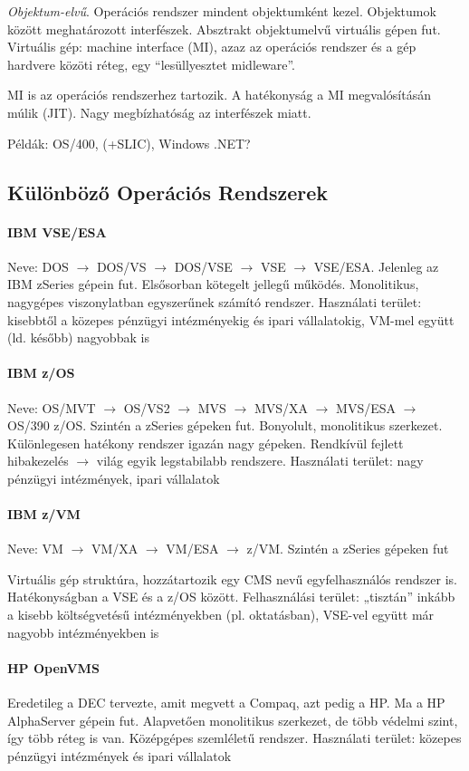 \documentclass[fleqn,10pt,a4paper]{article}
\theoremstyle{magyar}
\begin{document}
  \emph{Objektum-elvű}. Operációs rendszer mindent objektumként kezel. Objektumok között meghatározott
  interfészek. Absztrakt objektumelvű virtuális gépen fut. Virtuális gép: machine interface (MI), azaz az operációs
  rendszer és a gép hardvere közöti réteg, egy ``lesüllyesztet midleware''.
  
  MI is az operációs rendszerhez tartozik. A hatékonyság a MI megvalósításán múlik (JIT). Nagy megbízhatóság az
  interfészek miatt.
  
  Példák: OS/400, (+SLIC), Windows .NET?

  \subsection{Különböző Operációs Rendszerek}

  \paragraph{IBM VSE/ESA} Neve: DOS $\to$ DOS/VS $\to$ DOS/VSE $\to$ VSE $\to$ VSE/ESA. Jelenleg az IBM zSeries gépein fut.
  Elsősorban kötegelt jellegű működés. Monolitikus, nagygépes viszonylatban egyszerűnek számító rendszer.
  Használati terület: kisebbtől a közepes pénzügyi intézményekig és ipari vállalatokig, VM-mel együtt (ld. később)
  nagyobbak is


  \paragraph{IBM z/OS} Neve: OS/MVT $\to$ OS/VS2 $\to$ MVS $\to$ MVS/XA $\to$ MVS/ESA $\to$ OS/390 z/OS.
  Szintén a zSeries gépeken fut. Bonyolult, monolitikus szerkezet. Különlegesen hatékony rendszer igazán nagy gépeken.
  Rendkívül fejlett hibakezelés $\to$ világ egyik legstabilabb rendszere.
  Használati terület: nagy pénzügyi intézmények, ipari vállalatok

  \paragraph{IBM z/VM} Neve: VM $\to$ VM/XA $\to$ VM/ESA $\to$ z/VM. Szintén a zSeries gépeken fut 

  Virtuális gép struktúra, hozzátartozik egy CMS nevű egyfelhasználós rendszer is. Hatékonyságban a VSE és a z/OS
  között. Felhasználási terület: „tisztán” inkább a kisebb költségvetésű intézményekben (pl. oktatásban), VSE-vel együtt
  már nagyobb intézményekben is 


  \paragraph{HP OpenVMS}
  Eredetileg a DEC tervezte, amit megvett a Compaq, azt pedig a HP.
  Ma a HP AlphaServer gépein fut. Alapvetően monolitikus szerkezet, de több védelmi szint, így több réteg is van.
  Középgépes szemléletű rendszer. Használati terület: közepes pénzügyi intézmények és ipari vállalatok
\end{document}

